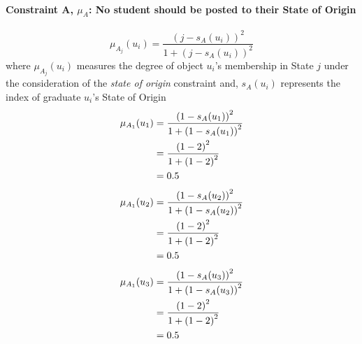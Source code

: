 \documentclass[a4paper]{book}
\begin{document}
			\paragraph{Constraint A, $\mu_A$: No student should be posted to their State of Origin}
				\begin{equation}
					\mu_{A_j}(u_i) = \frac{\left(j-s_A(u_i)\right)^2}{1 + \left(j-s_A(u_i)\right)^2}
				\end{equation}
				where $\mu_{A_j}(u_i)$ measures the degree of object $u_i$'s membership in State $j$ under the consideration of the \textit{state of origin} constraint and,
				$s_A(u_i)$ represents the index of graduate $u_i$'s State of Origin\\
				\begin{align}
					\mu_{A_1}(u_1) &= \frac{\left(1-s_A(u_1)\right)^2}{1 + \left(1-s_A(u_1)\right)^2}\\
					&= \frac{\left(1-2\right)^2}{1 + \left(1-2\right)^2} \notag \\
					&= 0.5 \notag
				\end{align}
				\begin{align}
					\mu_{A_1}(u_2) &= \frac{\left(1-s_A(u_2)\right)^2}{1 + \left(1-s_A(u_2)\right)^2}\\
					&= \frac{\left(1-2\right)^2}{1 + \left(1-2\right)^2} \notag \\
					&= 0.5 \notag
				\end{align}
				\begin{align}
					\mu_{A_1}(u_3) &= \frac{\left(1-s_A(u_3)\right)^2}{1 + \left(1-s_A(u_3)\right)^2}\\
					&= \frac{\left(1-2\right)^2}{1 + \left(1-2\right)^2} \notag \\
					&= 0.5 \notag
				\end{align}
\end{document}
